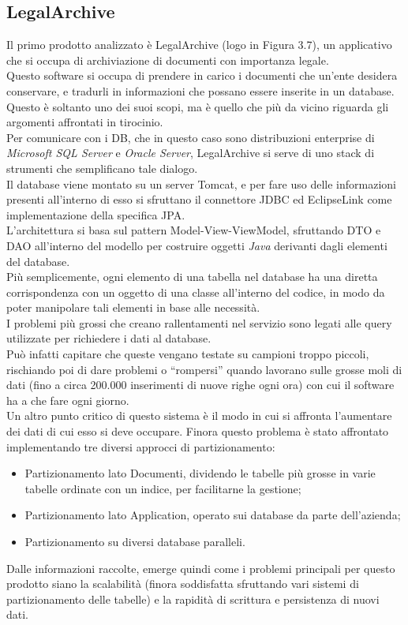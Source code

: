\subsection{LegalArchive}
Il primo prodotto analizzato è LegalArchive (logo in Figura 3.7), un applicativo che si occupa di archiviazione di documenti con importanza legale\cite{site:legalarchive}.\\
Questo software si occupa di prendere in carico i documenti che un'ente desidera conservare, e tradurli in informazioni che possano essere inserite in un database.\\
Questo è soltanto uno dei suoi scopi, ma è quello che più da vicino riguarda gli argomenti affrontati in tirocinio.\\
Per comunicare con i DB, che in questo caso sono distribuzioni enterprise di \textit{Microsoft SQL Server} e \textit{Oracle Server}, LegalArchive si serve di uno stack di strumenti che semplificano tale dialogo.\\
Il database viene montato su un server \gls{Tomcat}, e per fare uso delle informazioni presenti all'interno di esso si sfruttano il connettore \gls{JDBC} ed \gls{EclipseLink} come implementazione della specifica \gls{JPA}.\\
L'architettura si basa sul pattern \gls{Model-View-ViewModel}, sfruttando \gls{DTO} e \gls{DAO} all'interno del modello per costruire oggetti \textit{Java} derivanti dagli elementi del database.\\
Più semplicemente, ogni elemento di una tabella nel database ha una diretta corrispondenza con un oggetto di una classe all'interno del codice, in modo da poter manipolare tali elementi in base alle necessità.\\
I problemi più grossi che creano rallentamenti nel servizio sono legati alle query utilizzate per richiedere i dati al database.\\
Può infatti capitare che queste vengano testate su campioni troppo piccoli, rischiando poi di dare problemi o ``rompersi'' quando lavorano sulle grosse moli di dati (fino a circa 200.000 inserimenti di nuove righe ogni ora) con cui il software ha a che fare ogni giorno.\\
Un altro punto critico di questo sistema è il modo in cui si affronta l'aumentare dei dati di cui esso si deve occupare. Finora questo problema è stato affrontato implementando tre diversi approcci di partizionamento:
\begin{itemize}
    \item Partizionamento lato Documenti, dividendo le tabelle più grosse in varie tabelle ordinate con un indice, per facilitarne la gestione;
    \item Partizionamento lato Application, operato sui database da parte dell'azienda;
    \item Partizionamento su diversi database paralleli.
\end{itemize}
Dalle informazioni raccolte, emerge quindi come i problemi principali per questo prodotto siano la scalabilità (finora soddisfatta sfruttando vari sistemi di partizionamento delle tabelle) e la rapidità di scrittura e persistenza di nuovi dati.


